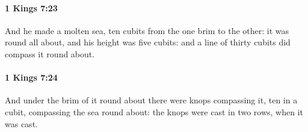 		\paragraph{1 Kings 7:23} %
			\label{1KINGS-7-23}

			And he made a molten sea, ten cubits from the one brim to the other: it was round all about, and his height was five cubits: and a line of thirty cubits did compass it round about.


		\paragraph{1 Kings 7:24} %
			\label{1KINGS-7-24}

			And under the brim of it round about there were knops compassing it, ten in a cubit, compassing the sea round about: the knops were cast in two rows, when it was cast.



